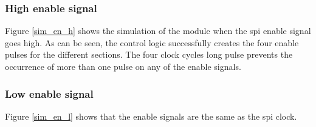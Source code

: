 \subsubsection{High enable signal}
Figure \ref{sim_en_h} shows the simulation of the module when the spi enable signal goes high. As can be seen, the control logic successfully creates the four enable pulses for the different sections. The four clock cycles long pulse prevents the occurrence of more than one pulse on any of the enable signals. 




\subsubsection{Low enable signal}
Figure \ref{sim_en_l} shows that the enable signals are the same as the spi clock.



